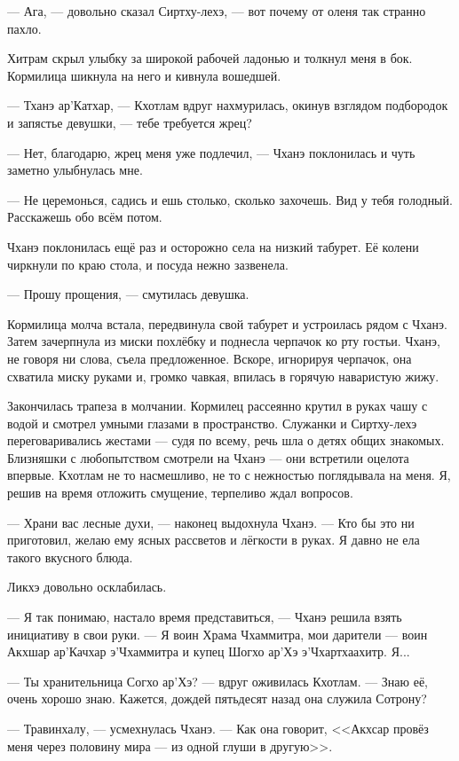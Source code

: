 --- Ага, --- довольно сказал Сиртху-лехэ, --- вот почему от оленя так странно пахло.

Хитрам скрыл улыбку за широкой рабочей ладонью и толкнул меня в бок.
Кормилица шикнула на него и кивнула вошедшей.

--- Тханэ ар’Катхар, --- Кхотлам вдруг нахмурилась, окинув взглядом подбородок и запястье девушки, --- тебе требуется жрец?

--- Нет, благодарю, жрец меня уже подлечил, --- Чханэ поклонилась и чуть заметно улыбнулась мне.

--- Не церемонься, садись и ешь столько, сколько захочешь.
Вид у тебя голодный.
Расскажешь обо всём потом.

Чханэ поклонилась ещё раз и осторожно села на низкий табурет.
Её колени чиркнули по краю стола, и посуда нежно зазвенела.

--- Прошу прощения, --- смутилась девушка.

Кормилица молча встала, передвинула свой табурет и устроилась рядом с Чханэ.
Затем зачерпнула из миски похлёбку и поднесла черпачок ко рту гостьи.
Чханэ, не говоря ни слова, съела предложенное.
Вскоре, игнорируя черпачок, она схватила миску руками и, громко чавкая, впилась в горячую наваристую жижу.

Закончилась трапеза в молчании.
Кормилец рассеянно крутил в руках чашу с водой и смотрел умными глазами в пространство.
Служанки и Сиртху-лехэ переговаривались жестами --- судя по всему, речь шла о детях общих знакомых.
Близняшки с любопытством смотрели на Чханэ --- они встретили оцелота впервые.
Кхотлам не то насмешливо, не то с нежностью поглядывала на меня.
Я, решив на время отложить смущение, терпеливо ждал вопросов.

--- Храни вас лесные духи, --- наконец выдохнула Чханэ.
--- Кто бы это ни приготовил, желаю ему ясных рассветов и лёгкости в руках.
Я давно не ела такого вкусного блюда.

Ликхэ довольно осклабилась.

--- Я так понимаю, настало время представиться, --- Чханэ решила взять инициативу в свои руки.
--- Я воин Храма Чхаммитра, мои дарители --- воин Акхшар ар’Качхар э’Чхаммитра и купец Шогхо ар’Хэ э’Чхартхаахитр.
Я...

--- Ты хранительница Согхо ар’Хэ? --- вдруг оживилась Кхотлам.
--- Знаю её, очень хорошо знаю.
Кажется, дождей пятьдесят назад она служила Сотрону?

--- Травинхалу, --- усмехнулась Чханэ.
--- Как она говорит, <<Акхсар провёз меня через половину мира --- из одной глуши в другую>>.

